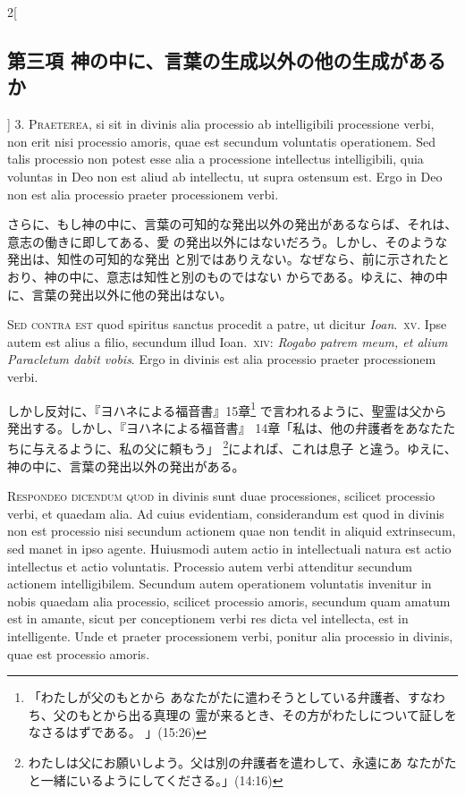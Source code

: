 \documentclass[paper=a4paper,fontsize=10pt,jafontsize=9pt,titlepage]{jlreq}
\begin{document}
\begin{paracol}{2}[\subsection{第三項 神の中に、言葉の生成以外の他の生成があるか}]
3. {\scshape Praeterea}, si sit in divinis alia processio ab intelligibili processione
verbi, non erit nisi processio amoris, quae est secundum voluntatis
operationem. Sed talis processio non potest esse alia a processione
intellectus intelligibili, quia voluntas in Deo non est aliud ab
intellectu, ut supra ostensum est. Ergo in Deo non est alia processio
praeter processionem verbi.


\switchcolumn


さらに、もし神の中に、言葉の可知的な発出以外の発出があるならば、それは、意志の働きに即してある、愛
 の発出以外にはないだろう。しかし、そのような発出は、知性の可知的な発出
 と別ではありえない。なぜなら、前に示されたとおり、神の中に、意志は知性と別のものではない
 からである。ゆえに、神の中に、言葉の発出以外に他の発出はない。


\switchcolumn*[\subsection{s.c.}]


{\scshape Sed contra est} quod spiritus sanctus procedit a patre, ut dicitur
{\itshape Ioan}.~{\scshape xv}. Ipse autem est alius a filio, secundum illud Ioan.~{\scshape xiv}: {\itshape Rogabo
patrem meum, et alium Paracletum dabit vobis}. Ergo in divinis est alia
processio praeter processionem verbi.


\switchcolumn


しかし反対に、『ヨハネによる福音書』15章\footnote{「わたしが父のもとから
 あなたがたに遣わそうとしている弁護者、すなわち、父のもとから出る真理の
 霊が来るとき、その方がわたしについて証しをなさるはずである。 」(15:26)}
 で言われるように、聖霊は父から発出する。しかし、『ヨハネによる福音書』
 14章「私は、他の弁護者をあなたたちに与えるように、私の父に頼もう」
 \footnote{わたしは父にお願いしよう。父は別の弁護者を遣わして、永遠にあ
 なたがたと一緒にいるようにしてくださる。」(14:16) }によれば、これは息子
 と違う。ゆえに、神の中に、言葉の発出以外の発出がある。




{\scshape Respondeo dicendum quod} in divinis sunt duae processiones, scilicet
processio verbi, et quaedam alia. Ad cuius evidentiam, considerandum est
quod in divinis non est processio nisi secundum actionem quae non tendit
in aliquid extrinsecum, sed manet in ipso agente. Huiusmodi autem actio
in intellectuali natura est actio intellectus et actio
voluntatis. Processio autem verbi attenditur secundum actionem
intelligibilem. Secundum autem operationem voluntatis invenitur in nobis
quaedam alia processio, scilicet processio amoris, secundum quam amatum
est in amante, sicut per conceptionem verbi res dicta vel intellecta,
est in intelligente. Unde et praeter processionem verbi, ponitur alia
processio in divinis, quae est processio amoris.



\end{paracol}
\end{document}
